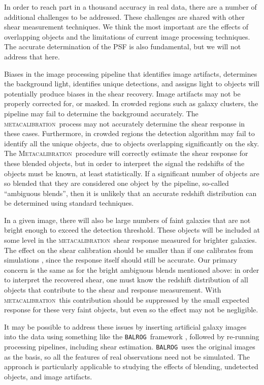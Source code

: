 \documentclass[iop]{emulateapj}
\newcommand{\mcal}{\textsc{metacalibration}}
\newcommand{\Mcal}{\textsc{Metacalibration}}
\newcommand{\balrog}{\texttt{BALROG}}
\begin{document}
In order to reach part in a thousand accuracy in real data, there are a number
of additional challenges to be addressed.  These challenges are shared with
other shear measurement techniques.  We think the most important are the
effects of overlapping objects and the limitations of current image processing
techniques. The accurate determination of the PSF is also fundamental, but we
will not address that here.

Biases in the image processing pipeline that identifies image artifacts,
determines the background light, identifies unique detections, and assigns
light to objects will potentially produce biases in the shear recovery.  Image
artifacts may not be properly corrected for, or masked.  In crowded regions
such as galaxy clusters, the pipeline may fail to determine the background
accurately.  The \mcal\ process may not accurately determine the shear response
in these cases.  Furthermore, in crowded regions the detection algorithm may
fail to identify all the unique objects, due to objects overlapping
significantly on the sky.  The \Mcal\ procedure will correctly estimate the
shear response for these blended objects, but in order to interpret the signal
the redshifts of the objects must be known, at least statistically.  If a
significant number of objects are so blended that they are considered one
object by the pipeline, so-called ``ambiguous blends'', then it is unlikely
that an accurate redshift distribution can be determined using standard
techniques.

In a given image, there will also be large numbers of faint galaxies that are
not bright enough to exceed the detection threshold.  These objects will be
included at some level in the \mcal\ shear response measured for brighter
galaxies.  The effect on the shear calibration should be smaller than if one
calibrates from simulations \citep[see e.g.][]{Hoekstra2016}, since the
response itself should still be accurate.  Our primary concern is the same as
for the bright ambiguous blends mentioned above: in order to interpret the
recovered shear, one must know the redshift distribution of all objects that
contribute to the shear and response measurement.  With \mcal\ this
contribution should be suppressed by the small expected response for these
very faint objects, but even so the effect may not be negligible.


It may be possible to address these issues by inserting artificial galaxy
images into the data using something like the \balrog\ framework
\citep{Balrog2016}, followed by re-running processing pipelines, including
shear estimation.  \balrog\ uses the original images as the basis, so all the
features of real observations need not be simulated.  The approach is
particularly applicable to studying the effects of blending, undetected
objects, and image artifacts.
\end{document}
